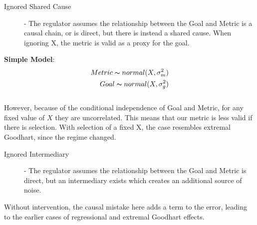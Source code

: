 \documentclass[10pt]{article}
\begin{document}
\begin{figure}[htb]
\centering
{}%
\hspace{0.25cm}
%
\end{figure}

\begin{description}
\item[Ignored Shared Cause] - The regulator assumes the relationship between the Goal and Metric is a causal chain, or is direct, but there is instead a shared cause. When ignoring X, the metric is valid as a proxy for the goal. 
\end{description}
\textbf{Simple Model}:  \begin{equation} \begin{split} Metric \thicksim normal(X, \sigma_{m}^2)\\ 
Goal \thicksim normal(X,  \sigma_{g}^2)\end{split}\end{equation} \\

However, because of the conditional independence of Goal and Metric, for any fixed value of $X$ they are uncorrelated.  This means that our metric is less  valid if there is selection. With selection of a fixed X, the case resembles extremal Goodhart, since the regime changed.

\begin{description}
\item[Ignored Intermediary] - The regulator assumes the relationship between the Goal and Metric is direct, but an intermediary exists which creates an additional source of noise.
\end{description}
Without intervention, the causal mistake here adds a term to the error, leading to the earlier cases of regressional and extremal Goodhart effects.
\end{document}
